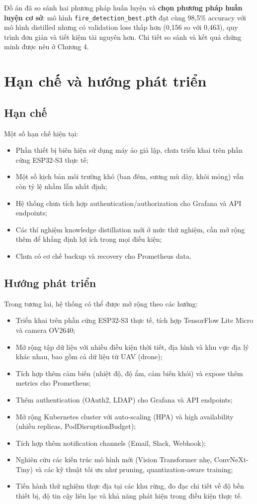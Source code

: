\documentclass[12pt,a4paper]{report}
\begin{document}
Đồ án đã so sánh hai phương pháp huấn luyện và \textbf{chọn phương pháp huấn luyện cơ sở}: mô hình \texttt{fire\_detection\_best.pth} đạt cùng 98{,}5\% accuracy với mô hình distilled nhưng có validation loss thấp hơn (0{,}156 so với 0{,}463), quy trình đơn giản và tiết kiệm tài nguyên hơn. Chi tiết so sánh và kết quả chứng minh được nêu ở Chương 4.

\section{Hạn chế và hướng phát triển}

\subsection{Hạn chế}

Một số hạn chế hiện tại:
\begin{itemize}
  \item Phần thiết bị biên hiện sử dụng máy ảo giả lập, chưa triển khai trên phần cứng ESP32-S3 thực tế;
  \item Một số kịch bản môi trường khó (ban đêm, sương mù dày, khói mỏng) vẫn còn tỷ lệ nhầm lẫn nhất định;
  \item Hệ thống chưa tích hợp authentication/authorization cho Grafana và API endpoints;
  \item Các thí nghiệm knowledge distillation mới ở mức thử nghiệm, cần mở rộng thêm để khẳng định lợi ích trong mọi điều kiện;
  \item Chưa có cơ chế backup và recovery cho Prometheus data.
\end{itemize}

\subsection{Hướng phát triển}

Trong tương lai, hệ thống có thể được mở rộng theo các hướng:
\begin{itemize}
  \item Triển khai trên phần cứng ESP32-S3 thực tế, tích hợp TensorFlow Lite Micro và camera OV2640;
  \item Mở rộng tập dữ liệu với nhiều điều kiện thời tiết, địa hình và khu vực địa lý khác nhau, bao gồm cả dữ liệu từ UAV (drone);
  \item Tích hợp thêm cảm biến (nhiệt độ, độ ẩm, cảm biến khói) và expose thêm metrics cho Prometheus;
  \item Thêm authentication (OAuth2, LDAP) cho Grafana và API endpoints;
  \item Mở rộng Kubernetes cluster với auto-scaling (HPA) và high availability (nhiều replicas, PodDisruptionBudget);
  \item Tích hợp thêm notification channels (Email, Slack, Webhook);
  \item Nghiên cứu các kiến trúc mô hình mới (Vision Transformer nhẹ, ConvNeXt-Tiny) và các kỹ thuật tối ưu như pruning, quantization-aware training;
  \item Tiến hành thử nghiệm thực địa tại các khu rừng, đo đạc chi tiết về độ bền thiết bị, độ tin cậy liên lạc và khả năng phát hiện trong điều kiện thực tế.
\end{itemize}
\end{document}
